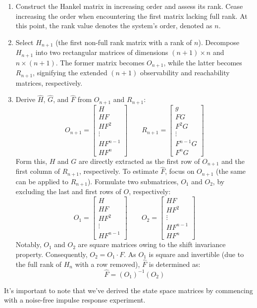 \begin{enumerate}
    \item Construct the Hankel matrix in increasing order and assess its rank. 
        Cease increasing the order when encountering the first matrix lacking full rank.
        At this point,  the rank value denotes the system's order, denoted as $n$.
    \item Select $H_{n+1}$ (the first non-full rank matrix with a rank of $n$). 
        Decompose $H_{n+1}$  into two rectangular matrices of dimensions $(n+1) \times n$ and $n \times (n+1)$.
        The former matrix becomes $O_{n+1}$, while the latter becomes $R_{n+1}$, signifying the extended $(n+1)$ observability and reachability matrices, respectively.
    \item Derive $\hat{H}$, $\hat{G}$, and $\hat{F}$ from $O_{n+1}$ and $R_{n+1}$: 
        \[O_{n+1}=\begin{bmatrix} H \\ HF \\ HF^2 \\ \vdots \\ HF^{n-1} \\ HF^{n} \end{bmatrix} \qquad R_{n+1}=\begin{bmatrix} g \\ FG \\ F^2G \\ \vdots \\ F^{n-1}G \\ F^{n}G \end{bmatrix}\]
        Form this, $H$ and $G$ are directly extracted as the first row of $O_{n+1}$ and the first column of $R_{n+1}$, respectively. 
        To estimate $\hat{F}$, focus on $O_{n+1}$ (the same can be applied to $R_{n+1}$). 
        Formulate two submatrices, $O_1$ and $O_2$, by excluding the last and first rows of $O$, respectively:
        \[O_{1}=\begin{bmatrix} H \\ HF \\ HF^2 \\ \vdots \\ HF^{n-1} \end{bmatrix} \qquad O_{2}=\begin{bmatrix} HF \\ HF^2 \\ \vdots \\ HF^{n-1} \\ HF^{n} \end{bmatrix}\]
        Notably, $O_1$ and $O_2$ are square matrices owing to the shift invariance property.
        Consequently, $O_2=O_1\cdot F$.
        As $O_1$  is square and invertible (due to the full rank of $H_n$ with a row removed), $\hat{F}$ is determined as:
        \[\hat{F}=(O_1)^{-1}(O_2)\]
\end{enumerate}
It's important to note that we've derived the state space matrices by commencing with a noise-free impulse response experiment.

